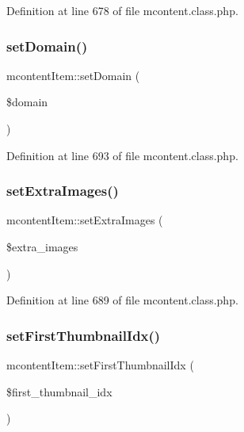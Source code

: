 Definition at line 678 of file mcontent.\+class.\+php.

\mbox{\label{classmcontentItem_adaf816a617e10b21c1b7cfa3080e4a25}} 
\subsubsection{\texorpdfstring{set\+Domain()}{setDomain()}}
{\footnotesize\ttfamily mcontent\+Item\+::set\+Domain (\begin{DoxyParamCaption}\item[{}]{\$domain }\end{DoxyParamCaption})}



Definition at line 693 of file mcontent.\+class.\+php.

\mbox{\label{classmcontentItem_a9907cf978c2b2dafbaeb307faea0874d}} 
\subsubsection{\texorpdfstring{set\+Extra\+Images()}{setExtraImages()}}
{\footnotesize\ttfamily mcontent\+Item\+::set\+Extra\+Images (\begin{DoxyParamCaption}\item[{}]{\$extra\+\_\+images }\end{DoxyParamCaption})}



Definition at line 689 of file mcontent.\+class.\+php.

\mbox{\label{classmcontentItem_a97b29510d9386112296071cb06bd68dd}} 
\subsubsection{\texorpdfstring{set\+First\+Thumbnail\+Idx()}{setFirstThumbnailIdx()}}
{\footnotesize\ttfamily mcontent\+Item\+::set\+First\+Thumbnail\+Idx (\begin{DoxyParamCaption}\item[{}]{\$first\+\_\+thumbnail\+\_\+idx }\end{DoxyParamCaption})}



